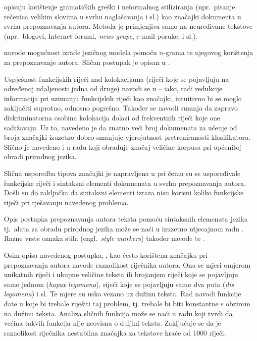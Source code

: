 \documentclass[11pt,english]{article}
\newcommand{\engl}[1]{(engl.~\emph{#1})}
\begin{document}
\begin{multicols}{2}
\citet{koppel2003exploiting} opisuju korištenje gramatičkih greški i
neformalnog stiliziranja (npr.~pisanje rečenica velikim slovima u svrhu
naglašavanja i sl.) kao značajki dokumenta u svrhu prepoznavanja autora. Metoda
je primjenjiva samo na neuređivane tekstove (npr.~blogovi, Internet forumi,
\emph{news grupe}, e-mail poruke, i sl.).

\citet{peng2003language} navode mogućnost izrade jezičnog modela pomoću $n$-grama te
njegovog korištenja za prepoznavanje autora. Sličan postupak je opisan u
\citep{coyotl2006authorship}.

Uspješnost funkcijskih riječi nad kolokacijama (riječi koje se
pojavljuju na određenoj udaljenosti jedna od druge) navodi se u
\citep{argamon2005measuring} -- iako, radi redukcije informacija pri uzimanju
funkcijskih riječi kao značajki, intuitivno bi se moglo zaključiti suprotno,
odnosno pogrešno. Također se navodi sumnja da zapravo diskriminatorna osobina
kolokacija dolazi od frekventnih riječi koje one sadržavaju. Uz to, navedeno je da znatno veći
broj dokumenata za učenje od broja značajki izuzetno dobro smanjuje
vjerojatnost pretreniranosti klasifikatora. Slično je navedeno i u
radu \citep{banko2001scaling} koji obrađuje značaj veličine korpusa pri
općenitoj obradi prirodnog jezika.

Slična usporedba tipova značajki je napravljena u \citep{uzuner2005comparative}
pri čemu su se uspoređivale funkcijske riječi i sintaksni elementi dokumenata u
svrhu prepoznavanja autora. Došli su do zaključka da sintaksni elementi izraza
nisu korisni koliko funkcijske riječi pri rješavanju navedenog problema.

Opis postupka prepoznavanja autora teksta pomoću sintaksnih elemenata jezika
tj.~alata za obradu prirodnog jezika može se naći u izuzetno utjecajnom radu
\citep{stamatatos2001computer}. Razne vrste oznaka stila \engl{style markers}
također navode \citet{diri2003automatic} te \citet{luyckx2005shallow}.

Osim opisa navedenog postupka, \citet{stamatatos2001computer}, kao često
korištenu značajku pri prepoznavanju autora navode raznolikost riječnika autora.
Ona se mjeri omjerom unikatnih riječi i ukupne veličine teksta ili brojanjem
riječi koje se pojavljuju samo jednom (\emph{hapax legomena}), riječi koje se
pojavljuju samo dva puta (\emph{dis legomena}) i sl. Te mjere su usko vezano uz
dužinu teksta. Rad navodi funkcije date u
\citep{yule1944statistical,honore1979some} koje bi trebale riješiti taj problem,
tj. trebale bi biti konstantne s obzirom na dužinu teksta. Analiza sličnih
funkcija može se naći u radu \citep{tweedie1998variable} koji tvrdi da većina
takvih funkcija nije neovisna o duljini teksta. Zaključuje se da je raznolikost
riječnika nestabilna značajka za tekstove kraće od 1000 riječi.


\end{multicols}
\end{document}
